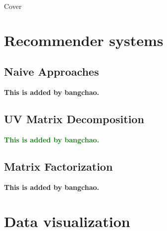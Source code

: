 \documentclass[12pt]{article}
\begin{document}
\thispagestyle{empty}
\begin{center}
\Huge    Cover
\end{center}

\newpage
\thispagestyle{empty}
\tableofcontents

\newpage
\section{Recommender systems}
\subsection{Naive Approaches}
\textbf{This is added by bangchao.}

\subsection{UV Matrix Decomposition}
\textcolor{green}{\textbf{This is added by bangchao.}}
\subsection{Matrix Factorization}
\textbf{This is added by bangchao.}
\section{Data visualization}
\end{document}
